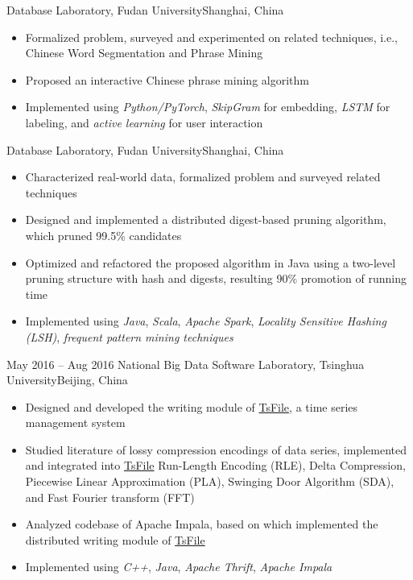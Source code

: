 \documentclass{resume}
\begin{document}
{Database Laboratory, Fudan University}{Shanghai, China}
\begin{itemize}
  \item Formalized problem, surveyed and experimented on related techniques, i.e., Chinese Word Segmentation and Phrase Mining
  \item Proposed an interactive Chinese phrase mining algorithm
  \item Implemented using \textit{Python/PyTorch}, \textit{SkipGram} for embedding, 
  \textit{LSTM} for labeling, and \textit{active learning} for user interaction
\end{itemize}

{Database Laboratory, Fudan University}{Shanghai, China}
\begin{itemize}
  \item Characterized real-world data, formalized problem and surveyed related techniques
  \item Designed and implemented a distributed digest-based pruning algorithm, which pruned 99.5\% candidates 
  \item Optimized and refactored the proposed algorithm in Java using a two-level pruning structure with hash and digests, resulting 90\% promotion of running time
  \item Implemented using \emph{Java}, \emph{Scala}, \emph{Apache Spark}, \emph{Locality Sensitive Hashing (LSH)}, \emph{frequent pattern mining techniques}
\end{itemize}

{May 2016 -- Aug 2016}
{National Big Data Software Laboratory, Tsinghua University}{Beijing, China}
\begin{itemize}
  \item Designed and developed the writing module of \href{https://github.com/thulab/tsfile}{\color{black} TsFile}, a time series management system
  \item Studied literature of lossy compression encodings of data series, implemented and integrated into \href{https://github.com/thulab/tsfile}{\color{black} TsFile} 
  Run-Length Encoding (RLE), Delta Compression, Piecewise Linear Approximation (PLA), Swinging Door Algorithm (SDA), and Fast Fourier transform (FFT)
  \item Analyzed codebase of Apache Impala, based on which implemented the distributed writing module of \href{https://github.com/thulab/tsfile}{\color{black} TsFile}
  \item Implemented using \emph{C++}, \emph{Java}, \emph{Apache Thrift}, \emph{Apache Impala}
\end{itemize}
\end{document}
